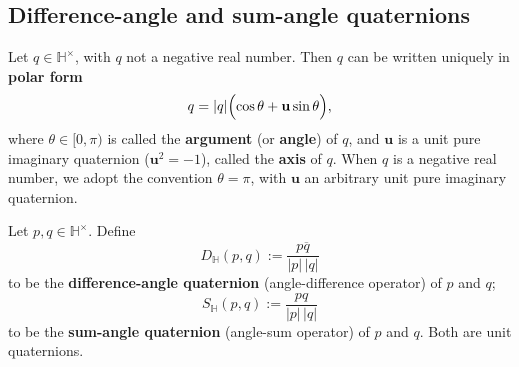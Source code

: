 \subsection{Difference-angle and sum-angle quaternions}

\begin{definition}\label{def:quaternion_polar}
Let $q\in\mathbb H^\times$, with $q$ not a negative real number. Then $q$ can be written uniquely in \textbf{polar form}
\[
q=|q|\Bigl(\cos\theta+\mathbf u\sin\theta\Bigr),
\]
where $\theta\in[0,\pi)$ is called the \textbf{argument} (or \textbf{angle}) of $q$, and $\mathbf u$ is a unit pure imaginary quaternion ($\mathbf u^2=-1$), called the \textbf{axis} of $q$. When $q$ is a negative real number, we adopt the convention $\theta=\pi$, with $\mathbf u$ an arbitrary unit pure imaginary quaternion.
\end{definition}

\begin{definition}\label{def:quaternion_diff_sum}
Let $p,q\in\mathbb H^\times$. Define
\[
\boxed{
D_{\mathbb H}(p,q):=\frac{p\overline q}{|p|\,|q|}
}
\]
to be the \textbf{difference-angle quaternion} (angle-difference operator) of $p$ and $q$;
\[
\boxed{
S_{\mathbb H}(p,q):=\frac{pq}{|p|\,|q|}
}
\]
to be the \textbf{sum-angle quaternion} (angle-sum operator) of $p$ and $q$. Both are unit quaternions.
\end{definition}

